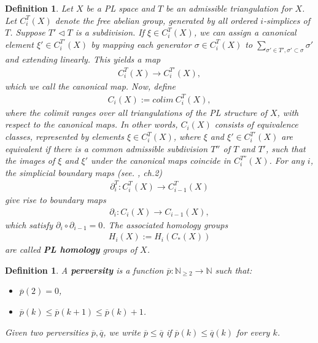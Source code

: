 \documentclass{scrreprt}
\newtheorem{definition}[prop]{Definition}
\begin{document}
\begin{definition}
Let $X$ be a PL space and $T$ be an admissible triangulation for $X$. Let $C_i^{T}(X)$ denote the free abelian group, generated by all ordered $i$-simplices of $T$. Suppose $T' \lhd T$ is a subdivision. If $\xi \in C_i^T(X)$, we can assign a canonical element $\xi' \in C_i^{T'}(X)$ by mapping each generator $\sigma \in C_i^T(X)$ to $\sum_{\sigma' \in T' , \sigma' \subset \sigma} \sigma' $ and extending linearly.
This yields a map
\begin{align*}
C_i^T(X) \to C_i^{T'}(X),
\end{align*}
which we call the canonical map. Now, define
\begin{align*}
C_i(X) := colim \ C_i^T(X),
\end{align*}
where the colimit ranges over all triangulations of the PL structure of $X$, with respect to the canonical maps. In other words, $C_i(X)$ consists of equivalence classes, represented by elements $\xi \in C_i^T(X)$, where $\xi$ and $\xi' \in C_i^{T'}(X)$ are equivalent if there is a common admissible subdivision $T''$ of $T$ and $T'$, such that the images of $\xi$ and $\xi'$ under the canonical maps coincide in $C_i^{T''}(X)$. For any $i$, the simplicial boundary maps (see. \cite{hatcher}, ch.2)
\begin{align*}
\partial_i^T: C_i^T(X) \to C_{i-1}^T(X)
\end{align*}
give rise to boundary maps 
\begin{align*}
\partial_i : C_i(X) \to C_{i-1}(X),
\end{align*}
which satisfy $\partial_i \circ \partial_{i-1}=0$. The associated homology groups
\begin{align*}
H_i(X):= H_i(C_*(X))
\end{align*}
are called \textbf{PL homology} groups of $X$.
\end{definition}

\begin{definition}
A \textbf{perversity} is a function $\overline{p}: \mathbb{N}_{\geq 2} \to \mathbb{N}$ such that:
\begin{itemize}
\item $\overline{p}(2)=0$,
\item $\overline{p}(k) \leq \overline{p}(k+1) \leq \overline{p}(k)+1$.
\end{itemize}
Given two perversities $\overline{p}, \overline{q}$, we write $\overline{p} \leq \overline{q}$ if $\overline{p}(k) \leq \overline{q}(k)$ for every $k$.
\end{definition}
\end{document}
